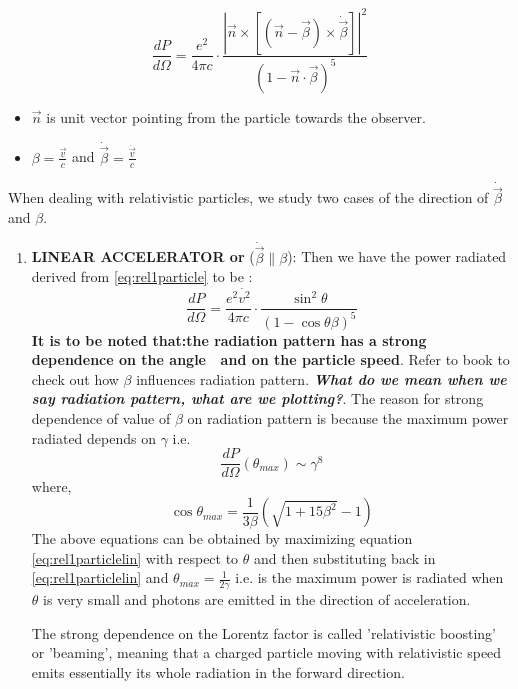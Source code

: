 \documentclass[12pt]{report}
\newcommand{\tbf}[1]{\textbf{#1}}
\newcommand{\tit}[1]{\textit{#1}}
\newcommand{\de}[2]{\frac{d{#1}}{d{#2}}}
\newcommand{\cbox}{tcolorbox}
\newcommand{\cc}[1]{\left({#1}\right)}
\newcommand{\rr}[1]{\left[{#1}\right]}
\newcommand{\vd}[1]{\dot{\vec{#1}}}
\begin{document}
\begin{equation}\label{eq:rel1particle}
\de{P}{\Omega}=\frac{e^2}{4 \pi c} \cdot \frac{|\vec{n}\times \rr{(\vec{n}-\vec{\beta})\times\dot{\vec{\beta}}}|^2}{(1- \vec{n}\cdot \vec{\beta})^5}
\end{equation}
\begin{itemize}
\item $\vec{n}$ is unit vector pointing from the particle towards the observer.
\item $\beta=\frac{\vec{v}}{c}$ and $\vd{\beta}=\frac{\vd{v}}{c}$
\end{itemize}
When dealing with relativistic particles, we study two cases of the direction of $\vd{\beta}$ and $\beta$.
\begin{enumerate}
\item \tbf{LINEAR ACCELERATOR or }($\vd{\beta} \parallel \beta$):
Then we have the power radiated derived from \eqref{eq:rel1particle} to be :
\begin{equation}\label{eq:rel1particlelin}
\de{P}{\Omega}=\frac{e^2 \dot{v^2}}{4 \pi c} \cdot \frac{\sin^2 \theta}{(1- \cos \theta \beta)^5}
\end{equation}
\tbf{It is to be noted that:the radiation pattern has a strong dependence on the angle  and on the particle speed}. Refer to book to check out how $\beta$ influences radiation pattern. \tbf{\tit{What do we mean when we say radiation pattern, what are we plotting?}}.
The reason for strong dependence of value of $\beta$ on radiation pattern is because the maximum power radiated depends on $\gamma$ i.e.
\begin{equation}
\de{P}{\Omega}(\theta_{max}) \sim \gamma^8
\end{equation}
where,
\begin{equation}
\cos \theta_{max}=\frac{1}{3 \beta}\cc{\sqrt{1+15 \beta^2}-1}
\end{equation}
The above equations can be obtained by maximizing equation \eqref{eq:rel1particlelin} with respect to $\theta$ and then substituting  back in \eqref{eq:rel1particlelin} and $\theta_{max}=\frac{1}{2\gamma}$ i.e. is the maximum power is radiated when $\theta$ is very small and photons are emitted in the direction of acceleration.
\begin{\cbox}
The strong dependence on the Lorentz factor is called 'relativistic boosting' or 'beaming', meaning that a charged particle moving with relativistic speed emits essentially its whole radiation in the forward direction. 
\end{\cbox} 


\end{enumerate}
\end{document}
